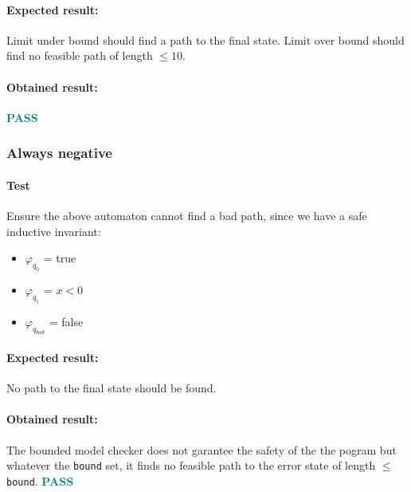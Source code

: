 \documentclass[letterpaper,12pt]{article}
\begin{document}
\paragraph{Expected result:}
Limit under bound should find a path to the final state.
Limit over bound should find no feasible path of length $\leq 10$.
\paragraph{Obtained result:}
\textbf{\textcolor{teal}{PASS}}

  
\subsubsection{Always negative}
\paragraph{Test}
Ensure the above automaton cannot find a bad path, since we have a safe inductive invariant:
\begin{itemize}
\item $\varphi _{q_0}$ = true
\item $\varphi _{q_1}$ = $ x < 0$
\item $\varphi _{q_{bad}}$ = false
\end{itemize}
\paragraph{Expected result:}
No path to the final state should be found.
\paragraph{Obtained result:}
The bounded model checker does not garantee the safety of the the pogram but whatever the \texttt{bound} set, it finds no feasible path to the error state of length $\leq$ \texttt{bound}.
\textbf{\textcolor{teal}{PASS}}
\end{document}

